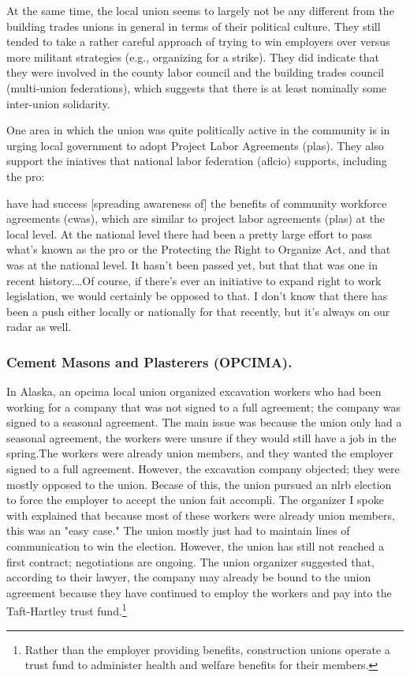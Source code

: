 \documentclass[12pt]{article}
\renewenvironment{quote}
  {\list{}{\leftmargin=\parindent\rightmargin=0pt}%
   \item\relax}
  {\endlist}
\begin{document}
At the same time, the local union seems to largely not be any different from the building trades unions in general in terms of their political culture. They still tended to take a rather careful approach of trying to win employers over versus more militant strategies (e.g., organizing for a strike). They did indicate that they were involved in the county labor council and the building trades council (multi-union federations), which suggests that there is at least nominally some inter-union solidarity.


One area in which the union was quite politically active in the community is in urging local government to adopt Project Labor Agreements (\acrshort{pla}s). They also support the iniatives that national labor federation (\acrshort{aflcio}) supports, including the \acrshort{pro}:

\begin{quote}
[We] have had success [spreading awareness of] the benefits of community workforce agreements (\acrshort{cwa}s), which are similar to project labor agreements (\acrshort{pla}s) at the local level. At the national level there had been a pretty large effort to pass what's known as the \acrshort{pro} or the Protecting the Right to Organize Act, and that was at the national level. It hasn't been passed yet, but that that was one in recent history.\ldots Of course, if there's ever an initiative to expand right to work legislation, we would certainly be opposed to that. I don't know that there has been a push either locally or nationally for that recently, but it’s always on our radar as well.
\end{quote}

\subsubsection{Cement Masons and Plasterers (OPCIMA).}

In Alaska, an \acrfull{opcima} local union organized excavation workers who had been working for a company that was not signed to a full agreement; the company was signed to a seasonal agreement. The main issue was because the union only had a seasonal agreement, the workers were unsure if they would still have a job in the spring.The workers were already union members, and they wanted the employer signed to a full agreement. However, the excavation company objected; they were mostly opposed to the union. Becase of this, the union pursued an \acrshort{nlrb} election to force the employer to accept the union fait accompli. The organizer I spoke with explained that because most of these workers were already union members, this was an "easy case." The union mostly just had to maintain lines of communication to win the election. However, the union has still not reached a first contract; negotiations are ongoing. The union organizer suggested that, according to their lawyer, the company may already be bound to the union agreement because they have continued to employ the workers and pay into the Taft-Hartley trust fund.\footnote{Rather than the employer providing benefits, construction unions operate a trust fund to administer health and welfare benefits for their members.}
\end{document}
